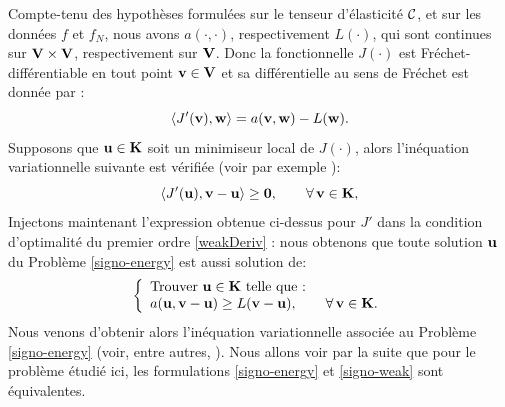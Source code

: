 \documentclass[11pt]{book}
\def\u{{\bf u}}
\def\vv{{\bf v}}
\def\w{{\bf w}}
\def\V{{\bf V}}
\def\K{{\bf K}}
\def\0{{\bf 0}}
\newcommand{\caC}{{\cal C}}
\begin{document}
Compte-tenu des hypothèses formulées sur le tenseur d'élasticité ${\caC}$, et sur les données $f$ et $f_N$, nous avons $a(\cdot,\cdot)$, respectivement $L(\cdot)$, qui sont continues sur $\V \times \V$, respectivement sur $\V$. Donc la fonctionnelle $J(\cdot)$ est Fr\'echet-différentiable en tout point $\vv \in \V$ et sa différentielle au sens de Fréchet est donnée par :
 \[
 \langle J'(\vv) , \w \rangle = a (\vv , \w ) - L(\w).
 \]
Supposons que $\u \in \K$ soit un minimiseur local de $J(\cdot)$, alors l'inéquation variationnelle suivante est vérifiée (voir par exemple \cite{kikuchi-oden-88}): %
 \begin{equation} \label{weakDeriv}
 \langle J'(\u) , \vv - \u \rangle \geq \0, \qquad \forall \, \vv \in \K,
 \end{equation}
Injectons maintenant l'expression obtenue ci-dessus pour $J'$ dans la condition d'optimalité du premier ordre \eqref{weakDeriv} : nous obtenons que toute solution $\u$ du Problème \eqref{signo-energy} est aussi solution de:
 \begin{equation} \label{signo-weak}
 \left\{
 \begin{array}{l}
 \hbox{Trouver } \u \in \K \hbox{ telle que :}\\
 a(\u,\vv - \u) \geq L(\vv -\u), \qquad \forall \, \vv \in \K.
 \end{array}
 \right.
 \end{equation}
Nous venons d'obtenir alors l'inéquation variationnelle associée au Problème
\eqref{signo-energy} (voir, entre autres, \cite{fichera-63,haslinger-96,kikuchi-oden-88}). 
Nous allons voir par la suite que pour le problème étudié ici, les formulations \eqref{signo-energy} et \eqref{signo-weak} sont équivalentes.
 
 \medskip
 
\end{document}
